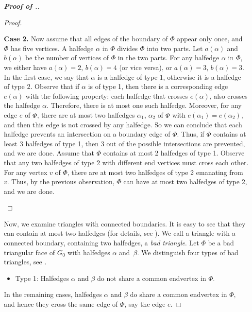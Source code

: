 \documentclass[10pt]{article}
\theoremstyle{definition}
\begin{document}
\begin{proof}[\bf Proof of .]
\begin{proof}
\begin{itemize}
        \textbf{Case 2.}
    Now assume that all edges of the boundary of $\Phi$ appear only once, 
    and $\Phi$ has five vertices. A
    halfedge $\alpha$ in $\Phi$ divides $\Phi$ into two parts. 
    Let $a(\alpha)$ and $b(\alpha)$ be the number of vertices of $\Phi$ in the two parts. 
    For any halfedge $\alpha$ in $\Phi$, we either have $a(\alpha)=2$, $b(\alpha)=4$ 
    (or vice versa), or $a(\alpha)=3$, $b(\alpha)=3$. 
    In the first case, we say that $\alpha$ is a halfedge of type 1, 
    otherwise it is a halfedge of type 2. 
    Observe that if $\alpha$ is of type 1, then there is a corresponding edge $e(\alpha)$ 
    with the following property: each halfedge that crosses $e(\alpha)$, 
    also crosses the halfedge $\alpha$. Therefore, there is at most one such halfedge. 
    Moreover, for any edge $e$ of $\Phi$, there are at most two halfedges $\alpha_1, \, \alpha_2$ 
    of $\Phi$ with $e(\alpha_1)= e(\alpha_2)$, and then this edge is not crossed by any halfedge. 
    So we can conclude that each halfedge prevents an intersection on a boundary edge of $\Phi$.
    Thus, if $\Phi$ contains at least $3$ halfedges of type 1, then $3$ out of the possible intersections are prevented, and we are done. 
    Assume that $\Phi$ contains at most $2$ halfedges of type 1. 
    Observe that any two halfedges of type 2 with different end vertices must cross each other. 
    For any vertex $v$ of $\Phi$, there are at most two halfedges of type 2 emanating from $v$. 
    Thus, by the previous observation, $\Phi$ can have at most two halfedges of type 2, and we are done. \qedhere
\end{itemize}
\end{proof}

Now, we examine triangles with connected boundaries.
It is easy to see that they can contain at most two halfedges (for details, see \cite[Lemma 2.1]{PT97}). We call a triangle with a connected boundary, containing two halfedges, a \emph{bad triangle}. Let $\Phi$ be a bad triangular face of $G_0$ with halfedges $\alpha$ and~$\beta$. We distinguish four types of bad triangles, see . 

\begin{itemize}
    \item Type 1:
    Halfedges $\alpha$ and $\beta$ do not share a common endvertex in $\Phi$.
\end{itemize}

In the remaining cases, halfedges $\alpha$ and $\beta$ do share a common endvertex in $\Phi$, and hence they cross the same edge of $\Phi$, say the edge $e$.


\end{proof}
\end{document}
